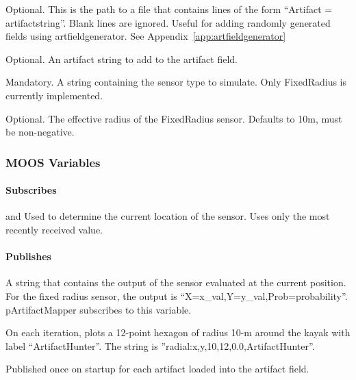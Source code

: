 \begin{hangpar}{\pin}{}
Optional. This is the path to a file that contains lines of the form ``Artifact = artifactstring''.  Blank lines are ignored.  Useful for adding randomly generated fields using artfieldgenerator.  See Appendix~\ref{app:artfieldgenerator}
\end{hangpar}

\begin{hangpar}{\pin}{}
Optional. An artifact string to add to the artifact field.
\end{hangpar}

\begin{hangpar}{\pin}{}
Mandatory. A string containing the sensor type to simulate.  Only FixedRadius is currently implemented.
\end{hangpar}

\begin{hangpar}{\pin}{}
Optional. The effective radius of the FixedRadius sensor.  Defaults to 10m, must be non-negative.
\end{hangpar}

\subsubsection{MOOS Variables}
\paragraph{Subscribes}
\begin{hangpar}{\pin}{ and }
Used to determine the current location of the sensor.  Uses only the most recently received value.
\end{hangpar}
\paragraph{Publishes}
\begin{hangpar}{\pin}{}
A string that contains the output of the sensor evaluated at the current position.  For the fixed radius sensor, the output is ``X=x\_val,Y=y\_val,Prob=probability''.  pArtifactMapper subscribes to this variable.
\end{hangpar}

\begin{hangpar}{\pin}{}
On each iteration, plots a 12-point hexagon of radius 10-m around the kayak with label ``ArtifactHunter''.  The string is ''radial:x,y,10,12,0.0,ArtifactHunter''.
\end{hangpar}

\begin{hangpar}{\pin}{}
Published once on startup for each artifact loaded into the artifact field.
\end{hangpar}
